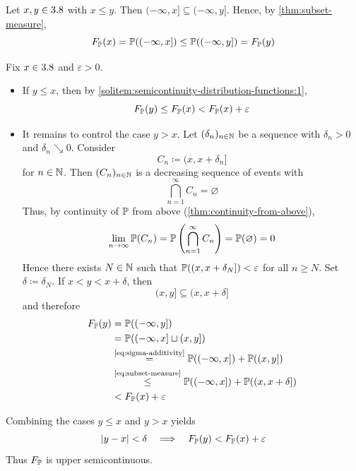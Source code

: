 \begin{solution}
\leavevmode
\begin{enumerate}[label={\protect\hyperref[exitem:semicontinuity-distribution-functions:\arabic*]{(\alph*)}}]
\item \label{solitem:semicontinuity-distribution-functions:1}
Let $x,y \in 3.8$ with $x \le y$.
Then
\(
(-\infty,x] \subseteq (-\infty,y]
\).
Hence, by \autoref{thm:subset-measure},
\[
F_{\mathbb{P}}(x)
=
\mathbb{P}((-\infty,x])
\le
\mathbb{P}((-\infty,y])
=
F_{\mathbb{P}}(y)
\]

\item \label{solitem:semicontinuity-distribution-functions:2}
Fix $x \in 3.8$ and $\varepsilon > 0$.
\begin{itemize}
\item
If $y \le x$, then by \ref{solitem:semicontinuity-distribution-functions:1},
\[
F_{\mathbb{P}}(y)
\le
F_{\mathbb{P}}(x)
<
F_{\mathbb{P}}(x)+\varepsilon
\]
\item
It remains to control the case $y>x$.
Let $(\delta_n)_{n \in \mathbb{N}}$ be a sequence with $\delta_n > 0$ and $\delta_n \searrow 0$.
Consider %
\[
C_n \coloneq (x,x+\delta_n]
\]
for $n \in \mathbb{N}$.
Then $(C_n)_{n \in \mathbb{N}}$ is a decreasing sequence of events with
\[
\bigcap_{n=1}^{\infty} C_n = \varnothing
\]
Thus, by continuity of $\mathbb{P}$ from above (\autoref{thm:continuity-from-above}),
\[
\lim_{n \to \infty} \mathbb{P}(C_n)
=
\mathbb{P}\left(\bigcap_{n=1}^{\infty} C_n\right)
=
\mathbb{P}(\varnothing)
=
0
\]
Hence there exists $N \in \mathbb{N}$ such that
\(
\mathbb{P}((x,x+\delta_N]) < \varepsilon
\) for all $n \ge N$.
Set
\(
\delta \coloneq \delta_N
\).
If $x<y<x+\delta$, then
\[
(x,y] \subseteq (x,x+\delta]
\]
and therefore
\[
\begin{aligned}
F_{\mathbb{P}}(y)
&=
\mathbb{P}((-\infty,y]) \\
&=
\mathbb{P}((-\infty,x] \sqcup (x,y]) \\
&\overset{\text{\eqref{eq:sigma-additivity}}}{=}
\mathbb{P}((-\infty,x]) + \mathbb{P}((x,y]) \\
&\overset{\text{\eqref{eq:subset-measure}}}{\leq}
\mathbb{P}((-\infty,x]) + \mathbb{P}((x,x+\delta]) \\
&<
F_{\mathbb{P}}(x)+\varepsilon
\end{aligned}
\]
\end{itemize}
Combining the cases $y \le x$ and $y>x$ yields
\[
|y-x| < \delta
\quad\Longrightarrow\quad
F_{\mathbb{P}}(y) < F_{\mathbb{P}}(x)+\varepsilon
\]
Thus $F_{\mathbb{P}}$ is upper semicontinuous.


\end{enumerate}
\end{solution}
